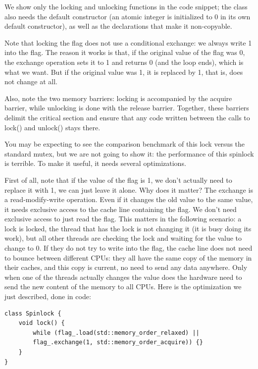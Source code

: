 We show only the locking and unlocking functions in the code snippet; the class also needs the default constructor (an atomic integer is initialized to 0 in its own default constructor), as well as the declarations that make it non-copyable.

Note that locking the flag does not use a conditional exchange: we always write 1 into the flag. The reason it works is that, if the original value of the flag was 0, the exchange operation sets it to 1 and returns 0 (and the loop ends), which is what we want. But if the original value was 1, it is replaced by 1, that is, does not change at all.

Also, note the two memory barriers: locking is accompanied by the acquire barrier, while unlocking is done with the release barrier. Together, these barriers delimit the critical section and ensure that any code written between the calls to lock() and unlock() stays there.

You may be expecting to see the comparison benchmark of this lock versus the standard mutex, but we are not going to show it: the performance of this spinlock is terrible. To make it useful, it needs several optimizations.

First of all, note that if the value of the flag is 1, we don't actually need to replace it with 1, we can just leave it alone. Why does it matter? The exchange is a read-modify-write operation. Even if it changes the old value to the same value, it needs exclusive access to the cache line containing the flag. We don't need exclusive access to just read the flag. This matters in the following scenario: a lock is locked, the thread that has the lock is not changing it (it is busy doing its work), but all other threads are checking the lock and waiting for the value to change to 0. If they do not try to write into the flag, the cache line does not need to bounce between different CPUs: they all have the same copy of the memory in their caches, and this copy is current, no need to send any data anywhere. Only when one of the threads actually changes the value does the hardware need to send the new content of the memory to all CPUs. Here is the optimization we just described, done in code:

\begin{lstlisting}[style=styleCXX]
class Spinlock {
	void lock() {
		while (flag_.load(std::memory_order_relaxed) ||
		flag_.exchange(1, std::memory_order_acquire)) {}
	}
}
\end{lstlisting}

